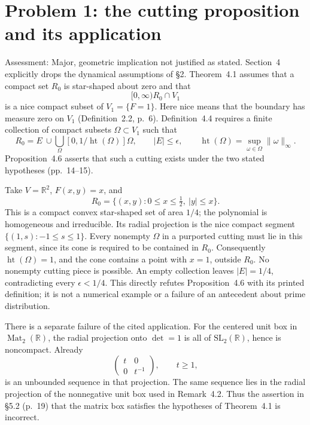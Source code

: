 \documentclass[10pt]{article}
\begin{document}
\section*{Problem 1: the cutting proposition and its application}
Assessment: Major, geometric implication not justified as stated. Section 4 explicitly drops the dynamical assumptions of §2. Theorem 4.1 assumes that a compact set \(R_0\) is star-shaped about zero and that \[[0,\infty)R_0\cap V_1\] is a nice compact subset of \(V_1=\{F=1\}\). Here nice means that the boundary has measure zero on \(V_1\) (Definition 2.2, p. 6). Definition 4.4 requires a finite collection of compact subsets \(\Omega\subset V_1\) such that \[R_0=E\ \cup\!\bigcup_\Omega[0,1/\operatorname{ht}(\Omega)]\Omega,
 \qquad |E|\le\epsilon,\qquad
 \operatorname{ht}(\Omega)=\sup_{\omega\in\Omega}\|\omega\|_\infty .\] Proposition 4.6 asserts that such a cutting exists under the two stated hypotheses (pp. 14–15).\par
Take \(V=\mathbb R^2\), \(F(x,y)=x\), and \[R_0=\{(x,y):0\le x\le\tfrac12,\ |y|\le x\}.\] This is a compact convex star-shaped set of area \(1/4\); the polynomial is homogeneous and irreducible. Its radial projection is the nice compact segment \(\{(1,s):-1\le s\le1\}\). Every nonempty \(\Omega\) in a purported cutting must lie in this segment, since its cone is required to be contained in \(R_0\). Consequently \(\operatorname{ht}(\Omega)=1\), and the cone contains a point with \(x=1\), outside \(R_0\). No nonempty cutting piece is possible. An empty collection leaves \(|E|=1/4\), contradicting every \(\epsilon<1/4\). This directly refutes Proposition 4.6 with its printed definition; it is not a numerical example or a failure of an antecedent about prime distribution.\par
There is a separate failure of the cited application. For the centered unit box in \(\operatorname{Mat}_2(\mathbb R)\), the radial projection onto \(\det=1\) is all of \(\mathrm{SL}_2(\mathbb R)\), hence is noncompact. Already \[\begin{pmatrix}t&0\\0&t^{-1}\end{pmatrix},
                  \qquad t\ge1,\] is an unbounded sequence in that projection. The same sequence lies in the radial projection of the nonnegative unit box used in Remark 4.2. Thus the assertion in §5.2 (p. 19) that the matrix box satisfies the hypotheses of Theorem 4.1 is incorrect.\par
\end{document}
